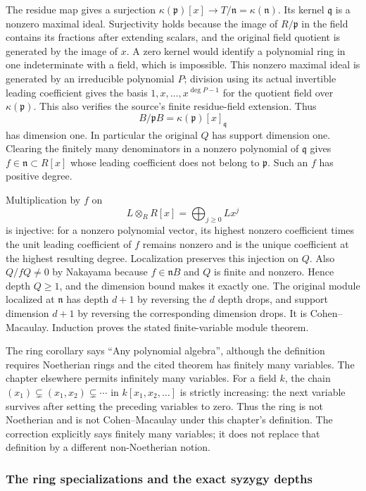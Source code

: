 The residue map gives a surjection \(\kappa(\mathfrak p)[x]\to T/\mathfrak n=\kappa(\mathfrak n)\). Its kernel \(\mathfrak q\) is a nonzero maximal ideal. Surjectivity holds because the image of \(R/\mathfrak p\) in the field contains its fractions after extending scalars, and the original field quotient is generated by the image of \(x\). A zero kernel would identify a polynomial ring in one indeterminate with a field, which is impossible. This nonzero maximal ideal is generated by an irreducible polynomial \(P\); division using its actual invertible leading coefficient gives the basis \(1,x,\ldots,x^{\deg P-1}\) for the quotient field over \(\kappa(\mathfrak p)\). This also verifies the source's finite residue-field extension. Thus \[
 B/\mathfrak pB=\kappa(\mathfrak p)[x]_{\mathfrak q}
\] has dimension one. In particular the original \(Q\) has support dimension one. Clearing the finitely many denominators in a nonzero polynomial of \(\mathfrak q\) gives \(f\in\mathfrak n\subset R[x]\) whose leading coefficient does not belong to \(\mathfrak p\). Such an \(f\) has positive degree.

Multiplication by \(f\) on \[
 L\otimes_R R[x]=\bigoplus_{j\ge0}Lx^j
\] is injective: for a nonzero polynomial vector, its highest nonzero coefficient times the unit leading coefficient of \(f\) remains nonzero and is the unique coefficient at the highest resulting degree. Localization preserves this injection on \(Q\). Also \(Q/fQ\ne0\) by Nakayama because \(f\in\mathfrak nB\) and \(Q\) is finite and nonzero. Hence depth \(Q\ge1\), and the dimension bound makes it exactly one. The original module localized at \(\mathfrak n\) has depth \(d+1\) by reversing the \(d\) depth drops, and support dimension \(d+1\) by reversing the corresponding dimension drops. It is Cohen--Macaulay. Induction proves the stated finite-variable module theorem.

The ring corollary says ``Any polynomial algebra'', although the definition requires Noetherian rings and the cited theorem has finitely many variables. The chapter elsewhere permits infinitely many variables. For a field \(k\), the chain \((x_1)\subsetneq(x_1,x_2)\subsetneq\cdots\) in \(k[x_1,x_2,\ldots]\) is strictly increasing: the next variable survives after setting the preceding variables to zero. Thus the ring is not Noetherian and is not Cohen--Macaulay under this chapter's definition. The correction explicitly says finitely many variables; it does not replace that definition by a different non-Noetherian notion.

\subsubsection{The ring specializations and the exact syzygy depths}\label{algebra-proof-019-the-ring-specializations-and-the-exact-syzygy-depths}

